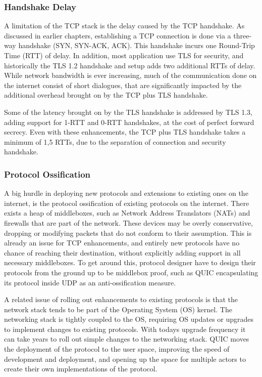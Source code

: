 \documentclass[english, 12pt, a4paper, elec, utf8, a-2b, online]{aaltothesis}
\begin{document}
\subsubsection{Handshake Delay}
A limitation of the TCP stack is the delay caused by the TCP handshake. As discussed
in earlier chapters, establishing a TCP connection is done via a three-way handshake
(SYN, SYN-ACK, ACK). This handshake incurs one Round-Trip Time (RTT) of delay. In
addition, most application use TLS for security, and historically the TLS 1.2 handshake
and setup adds two additional RTTs of delay. While network bandwidth is ever increasing,
much of the communication done on the internet consist of short dialogues, that
are significantly impacted by the additional overhead brought on by the TCP plus TLS
handshake\cite{quic_transport_protocol_design}.

Some of the latency brought on by the TLS handshake is addressed by TLS 1.3, adding
support for 1-RTT and 0-RTT handshakes, at the cost of perfect forward secrecy\cite{rfc8446}. Even with
these enhancements, the TCP plus TLS handshake takes a minimum of 1,5 RTTs, due to the separation
of connection and security handshake.

\subsubsection{Protocol Ossification}
A big hurdle in deploying new protocols and extensions to existing ones on the internet,
is the protocol ossification of existing protocols on the internet. There exists a heap
of middleboxes, such as Network Address Translators (NATs) and firewalls that are
part of the network. These devices may be overly conservative, dropping or 
modifying packets that do not conform to their assumption. This is already an
issue for TCP enhancements, and entirely new protocols have no chance of reaching
their destination, without explicitly adding support in all necessary middleboxes.
To get around this, protocol designer have to design their protocols from the ground
up to be middlebox proof, such as QUIC encapsulating its protocol inside UDP as an
anti-ossification measure\cite{Ossification}.

A related issue of rolling out enhancements to existing protocols is that the
network stack tends to be part of the Operating System (OS) kernel. The networking
stack is tightly coupled to the OS, requiring OS updates or upgrades to implement
changes to existing protocols. With todays upgrade frequency it can take years
to roll out simple changes to the networking stack. QUIC moves the deployment of the 
protocol to the user space, improving the speed of development and deployment,
and opening up the space for multiple actors to create their own implementations of
the protocol\cite{quic_transport_protocol_design}.
\end{document}
